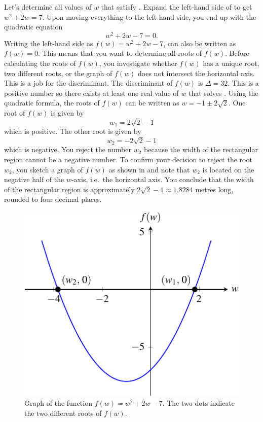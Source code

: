 \documentclass[a4paper,oneside,12pt]{article}
\begin{document}
\begin{solution}
Let's determine all values of $w$ that satisfy
.  Expand the left-hand side
of  to get $w^2 + 2w = 7$.
Upon moving everything to the left-hand side, you end up with the
quadratic equation
\begin{equation}
\label{eqn:rectangular_region_quadratic}
w^2 + 2w - 7
=
0.
\end{equation}
Writing the left-hand side as $f(w) = w^2 + 2w - 7$,
 can also be written as
$f(w) = 0$.  This means that you want to determine all roots of
$f(w)$.  Before calculating the roots of $f(w)$, you investigate
whether $f(w)$ has a unique root, two different roots, or the graph of
$f(w)$ does not intersect the horizontal axis.  This is a job for the
discriminant.  The discriminant of $f(w)$ is $\Delta = 32$.  This is a
positive number so there exists at least one real value of $w$ that
solves .  Using the
quadratic formula, the roots of $f(w)$ can be written as
$w = -1 \pm 2\sqrt{2}$.  One root of $f(w)$ is given by
\[
w_1
=
2\sqrt{2} - 1
\]
which is positive.  The other root is given by
\[
w_2
=
-2\sqrt{2} - 1
\]
which is negative.  You reject the number $w_2$ because the width of
the rectangular region cannot be a negative number.  To confirm your
decision to reject the root $w_2$, you sketch a graph of $f(w)$ as
shown in  and note that
$w_2$ is located on the negative half of the $w$-axis, i.e.~the
horizontal axis.  You conclude that the width of the rectangular
region is approximately $2\sqrt{2} - 1 \approx 1.8284$ metres long,
rounded to four decimal places.
\end{solution}

\begin{figure}[!htbp]
\centering
\includegraphics[scale=1.2]{image/09/a1-b2-cminus7.pdf}
\caption{%
  Graph of the function $f(w) = w^2 + 2w - 7$.  The two dots indicate
  the two different roots of $f(w)$.
}
\label{fig:rectangular_region_quadratic_roots}
\end{figure}
\end{document}
